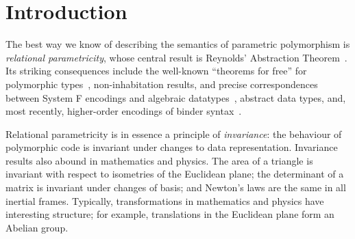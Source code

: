 \section{Introduction}
\label{sec:introduction}
The best way we know of describing the semantics of parametric
polymorphism is \emph{relational parametricity}, whose central result
is Reynolds' Abstraction Theorem~\cite{reynolds83types}. Its striking
consequences include the well-known ``theorems for free'' for
polymorphic types~\cite{wadler89theorems}, non-inhabitation results, and precise
correspondences between System F encodings and algebraic datatypes~\cite{PittsAM:parpoe},
abstract data types, and, most recently, higher-order encodings of
binder syntax~\cite{syntaxforfree}.

Relational parametricity is in essence a principle of
\emph{invariance}: the behaviour of polymorphic code is invariant
under changes to data representation. Invariance results also abound in
mathematics and physics. The area of a triangle is invariant with
respect to isometries of the Euclidean plane; the determinant of a
matrix is invariant under changes of basis; and Newton's laws are the
same in all inertial frames. Typically, transformations in mathematics
and physics have interesting structure; for example, translations in
the Euclidean plane form an Abelian group.





